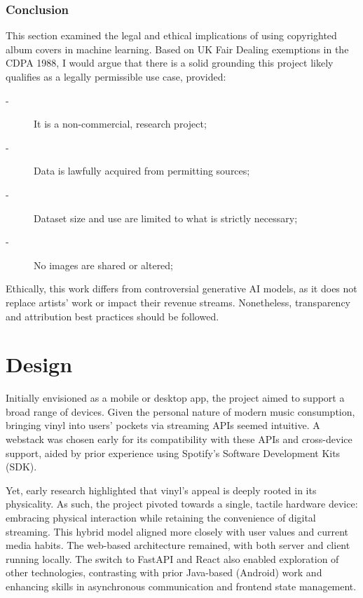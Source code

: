               \subsubsection{Conclusion}
    
                  This section examined the legal and ethical implications of using copyrighted album covers in machine learning. Based on UK Fair Dealing exemptions in the CDPA 1988, I would argue that there is a solid grounding this project likely qualifies as a legally permissible use case, provided:
                  \begin{description}
                      \item[-] It is a non-commercial, research project;
                      \item[-] Data is lawfully acquired from permitting sources;
                      \item[-] Dataset size and use are limited to what is strictly necessary;
                      \item[-] No images are shared or altered; %
                  \end{description}
                  
                  Ethically, this work differs from controversial generative AI models, as it does not replace artists' work or impact their revenue streams. Nonetheless, transparency and attribution best practices should be followed.
    
    \section{Design} %
    
        Initially envisioned as a mobile or desktop app, the project aimed to support a broad range of devices. Given the personal nature of modern music consumption, bringing vinyl into users' pockets via streaming APIs seemed intuitive. A webstack was chosen early for its compatibility with these APIs and cross-device support, aided by prior experience using Spotify's Software Development Kits (SDK).
    
        Yet, early research highlighted that vinyl's appeal is deeply rooted in its physicality. As such, the project pivoted towards a single, tactile hardware device: embracing physical interaction while retaining the convenience of digital streaming. This hybrid model aligned more closely with user values and current media habits. The web-based architecture remained, with both server and client running locally. The switch to FastAPI and React also enabled exploration of other technologies, contrasting with prior Java-based (Android) work and enhancing skills in asynchronous communication and frontend state management.
    
